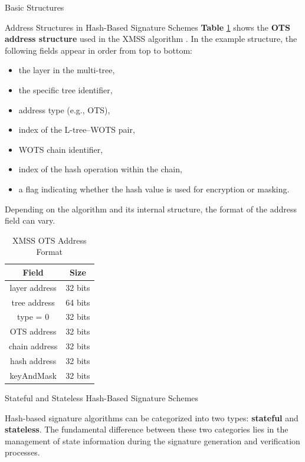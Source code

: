 \begin{section}{Basic Structures}{\label{sec1}}
\begin{subsection}{Address Structures in Hash-Based Signature Schemes}
\textbf{Table} \ref{tab: Adress} shows the \textbf{OTS address structure} used in the XMSS algorithm \cite{huelsing2018rfc}. In the example structure, the following fields appear in order from top to bottom:
\begin{itemize}
    \item the layer in the multi-tree,
    \item the specific tree identifier,
    \item address type (e.g., OTS),
    \item index of the L-tree–WOTS pair,
    \item WOTS chain identifier,
    \item index of the hash operation within the chain,
    \item a flag indicating whether the hash value is used for encryption or masking.
\end{itemize}

Depending on the algorithm and its internal structure, the format of the address field can vary.


\begin{table}[H]
\centering
\renewcommand{\arraystretch}{1.5}
\begin{tabular}{|c|c|}
\hline
\textbf{Field} & \textbf{Size} \\
\hline
layer address     & 32 bits \\
\hline
tree address      & 64 bits \\
\hline
type = 0          & 32 bits \\
\hline
OTS address       & 32 bits \\
\hline
chain address     & 32 bits \\
\hline
hash address      & 32 bits \\
\hline
keyAndMask        & 32 bits \\
\hline
\end{tabular}
\caption{XMSS OTS Address Format}
\label{tab: Adress}
\end{table}

\end{subsection}

\begin{subsection}{Stateful and Stateless Hash-Based Signature Schemes}

    Hash-based signature algorithms can be categorized into two types: \textbf{stateful} and \textbf{stateless}. The fundamental difference between these two categories lies in the management of state information during the signature generation and verification processes.


\end{subsection}
\end{section}
